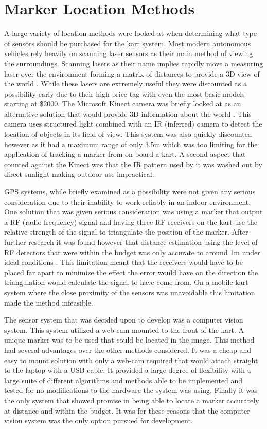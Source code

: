 \section{Marker Location Methods}

A large variety of location methods were looked at when determining what type of sensors should be purchased for the kart system. Most modern autonomous vehicles rely heavily on scanning laser sensors as their main method of viewing the surroundings. Scanning lasers as their name implies rapidly move a measuring laser over the environment forming a matrix of distances to provide a 3D view of the world \cite{laser}. While these lasers are extremely useful they were discounted as a possibility early due to their high price tag with even the most basic models starting at \$2000. The Microsoft Kinect camera was briefly looked at as an alternative solution that would provide 3D information about the world \cite{kinect}. This camera uses structured light combined with an IR (inferred) camera to detect the location of objects in its field of view. This system was also quickly discounted however as it had a maximum range of only 3.5m which was too limiting for the application of tracking a marker from on board a kart. A second aspect that counted against the Kinect was that the IR pattern used by it was washed out by direct sunlight making outdoor use impractical.

GPS systems, while briefly examined as a possibility were not given any serious consideration due to their inability to work reliably in an indoor environment. One solution that was given serious consideration was using a marker that output a RF (radio frequency) signal and having three RF receivers on the kart use the  relative strength of the signal to triangulate the position of the marker. After further research it was found however that distance estimation using the level of RF detectors that were within the budget was only accurate to around 1m under ideal conditions \cite{rf}. This limitation meant that the receivers would have to be placed far apart to minimize the effect the error would have on the direction the triangulation would calculate the signal to have come from. On a mobile kart system where the close proximity of the sensors was unavoidable this limitation made the method infeasible.

The sensor system that was decided upon to develop was a computer vision system. This system utilized a web-cam mounted to the front of the kart. A unique marker was to be used that could be located in the image. This method had several advantages over the other methods considered. It was a cheap and easy to mount solution with only a web-cam required that would attach straight to the laptop with a USB cable. It provided a large degree of flexibility with a large suite of different algorithms and methods able to be implemented and tested for no modifications to the hardware the system was using. Finally it was the only system that showed promise in being able to locate a marker accurately at distance and within the budget. It was for these reasons that the computer vision system was the only option pursued for development.